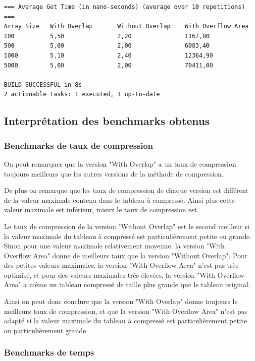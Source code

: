 \documentclass[titlepage]{article}
\begin{document}
\begin{lstlisting}
=== Average Get Time (in nano-seconds) (average over 10 repetitions) ===
Array Size   With Overlap       Without Overlap    With Overflow Area
100          5,50               2,20               1167,80           
500          5,00               2,00               6083,40           
1000         5,10               2,40               12364,90          
5000         5,00               2,00               70411,00          

BUILD SUCCESSFUL in 8s
2 actionable tasks: 1 executed, 1 up-to-date
\end{lstlisting} 

\subsection{Interprétation des benchmarks obtenus}

\subsubsection{Benchmarks de taux de compression}

On peut remarquer que la version "With Overlap" a un taux de compression toujours meilleurs que les autres versions de la méthode de compression.
\par De plus on remarque que les taux de compression de chaque version est différent de la valeur maximale contenu dans le tableau à compressé. Ainsi plus cette valeur maximale est inférieur, mieux le taux de compression est.
\par Le taux de compression de la version "Without Overlap" est le second meilleur si la valeur maximale du tableau à compressé est particulièrement petite ou grande. Sinon pour une valeur maximale relativement moyenne, la version "With Overflow Area" donne de meilleurs taux que la version "Without Overlap". Pour des petites valeurs maximales, la version "With Overflow Area" n'est pas très optimisé, et pour des valeurs maximales très élevées, la version "With Overflow Area" a même un tableau compressé de taille plus grande que le tableau original.
\par Ainsi on peut donc conclure que la version "With Overlap" donne toujours le meilleurs taux de compression, et que la version "With Overflow Area" n'est pas adapté si la valeur maximale du tableau à compressé est particulièrement petite ou particulièrement grande. 


\subsubsection{Benchmarks de temps}
\end{document}

